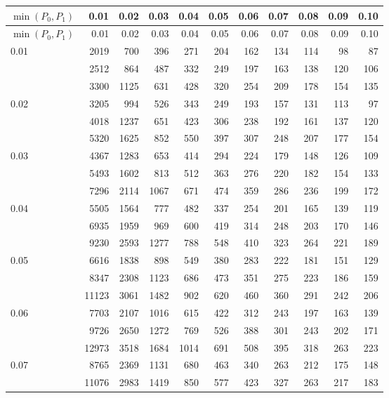 {\small\setlength{\tabcolsep}{3.5pt}
\begin{longtable}{lrrrrrrrrrr}
\toprule $\min(P_0,P_1)$ & 0.01 & 0.02 & 0.03 & 0.04 & 0.05 & 0.06 & 0.07 & 0.08 & 0.09 & 0.10\\\midrule
\endfirsthead
\toprule $\min(P_0,P_1)$ & 0.01 & 0.02 & 0.03 & 0.04 & 0.05 & 0.06 & 0.07 & 0.08 & 0.09 & 0.10\\\midrule
\endhead
0.01 & 2019 & 700 & 396 & 271 & 204 & 162 & 134 & 114 & 98 & 87\\*
 & 2512 & 864 & 487 & 332 & 249 & 197 & 163 & 138 & 120 & 106\\*
 & 3300 & 1125 & 631 & 428 & 320 & 254 & 209 & 178 & 154 & 135\\\midrule
0.02 & 3205 & 994 & 526 & 343 & 249 & 193 & 157 & 131 & 113 & 97\\*
 & 4018 & 1237 & 651 & 423 & 306 & 238 & 192 & 161 & 137 & 120\\*
 & 5320 & 1625 & 852 & 550 & 397 & 307 & 248 & 207 & 177 & 154\\\midrule
0.03 & 4367 & 1283 & 653 & 414 & 294 & 224 & 179 & 148 & 126 & 109\\*
 & 5493 & 1602 & 813 & 512 & 363 & 276 & 220 & 182 & 154 & 133\\*
 & 7296 & 2114 & 1067 & 671 & 474 & 359 & 286 & 236 & 199 & 172\\\midrule
0.04 & 5505 & 1564 & 777 & 482 & 337 & 254 & 201 & 165 & 139 & 119\\*
 & 6935 & 1959 & 969 & 600 & 419 & 314 & 248 & 203 & 170 & 146\\*
 & 9230 & 2593 & 1277 & 788 & 548 & 410 & 323 & 264 & 221 & 189\\\midrule
0.05 & 6616 & 1838 & 898 & 549 & 380 & 283 & 222 & 181 & 151 & 129\\*
 & 8347 & 2308 & 1123 & 686 & 473 & 351 & 275 & 223 & 186 & 159\\*
 & 11123 & 3061 & 1482 & 902 & 620 & 460 & 360 & 291 & 242 & 206\\\midrule
0.06 & 7703 & 2107 & 1016 & 615 & 422 & 312 & 243 & 197 & 163 & 139\\*
 & 9726 & 2650 & 1272 & 769 & 526 & 388 & 301 & 243 & 202 & 171\\*
 & 12973 & 3518 & 1684 & 1014 & 691 & 508 & 395 & 318 & 263 & 223\\\midrule
0.07 & 8765 & 2369 & 1131 & 680 & 463 & 340 & 263 & 212 & 175 & 148\\*
 & 11076 & 2983 & 1419 & 850 & 577 & 423 & 327 & 263 & 217 & 183\\*

\end{longtable}}
